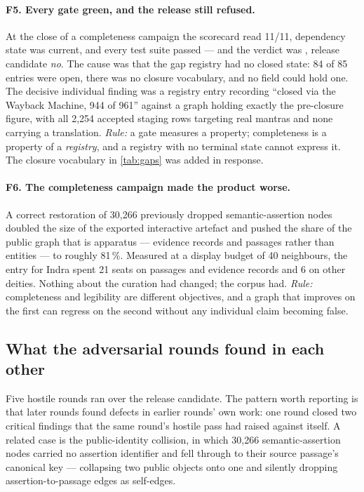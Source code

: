 \paragraph{F5. Every gate green, and the release still refused.} At the close of a
completeness campaign the scorecard read 11/11, dependency state was current, and
every test suite passed --- and the verdict was
, release candidate \emph{no}. The cause was
that the gap registry had no closed state: 84 of 85 entries were open, there was no
closure vocabulary, and no field could hold one. The decisive individual finding was
a registry entry recording ``closed via the Wayback Machine, 944 of 961'' against a
graph holding exactly the pre-closure figure, with all 2{,}254 accepted staging rows
targeting real mantras and none carrying a translation. \emph{Rule:} a gate measures
a property; completeness is a property of a \emph{registry}, and a registry with no
terminal state cannot express it. The closure vocabulary in \cref{tab:gaps} was added
in response.

\paragraph{F6. The completeness campaign made the product worse.} A correct
restoration of 30{,}266 previously dropped semantic-assertion nodes doubled the size
of the exported interactive artefact and pushed the share of the public graph that is
apparatus --- evidence records and passages rather than entities --- to roughly
81\,\%. Measured at a display budget of 40 neighbours, the entry for Indra spent 21
seats on passages and evidence records and 6 on other deities. Nothing about the
curation had changed; the corpus had. \emph{Rule:} completeness and legibility are
different objectives, and a graph that improves on the first can regress on the
second without any individual claim becoming false.



\subsection{What the adversarial rounds found in each other}

Five hostile rounds ran over the release candidate. The pattern worth reporting is
that later rounds found defects in earlier rounds' own work: one round closed two
critical findings that the same round's hostile pass had raised against itself. A
related case is the public-identity collision, in which 30{,}266 semantic-assertion
nodes carried no assertion identifier and fell through to their source passage's
canonical key --- collapsing two public objects onto one and silently dropping
assertion-to-passage edges as self-edges.

